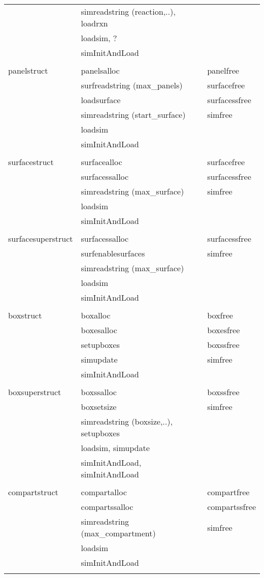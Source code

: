 \documentclass {book}
\begin{document}
\begin{ttfamily}
\begin{longtable}[c]{lll}
&simreadstring (reaction,..), loadrxn\\
&loadsim, ?\\
&simInitAndLoad\\
\\
panelstruct&panelsalloc&panelfree\\
&surfreadstring (max\_panels)&surfacefree\\
&loadsurface&surfacessfree\\
&simreadstring (start\_surface)&simfree\\
&loadsim\\
&simInitAndLoad&\\
\\
surfacestruct&surfacealloc&surfacefree\\
&surfacessalloc&surfacessfree\\
&simreadstring (max\_surface)&simfree\\
&loadsim\\
&simInitAndLoad\\
\\
surfacesuperstruct&surfacessalloc&surfacessfree\\
&surfenablesurfaces&simfree\\
&simreadstring (max\_surface)\\
&loadsim\\
&simInitAndLoad\\
\\
boxstruct&boxalloc&boxfree\\
&boxesalloc&boxesfree\\
&setupboxes&boxssfree\\
&simupdate&simfree\\
&simInitAndLoad\\
\\
boxsuperstruct&boxssalloc&boxssfree\\
&boxsetsize&simfree\\
&simreadstring (boxsize,..), setupboxes\\
&loadsim, simupdate\\
&simInitAndLoad, simInitAndLoad\\
\\
compartstruct&compartalloc&compartfree\\
&compartssalloc&compartssfree\\
&simreadstring (max\_compartment)&simfree\\
&loadsim\\
&simInitAndLoad\\
\\

\end{longtable}
\end{ttfamily}
\end{document}
